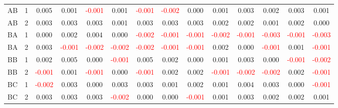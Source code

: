 \begin{table}[H]
{\begin{tabular}{llcccccccccccc}
AB & 1 & 0.005 & 0.001 & \textcolor{red}{-0.001} & 0.001 & \textcolor{red}{-0.001} & \textcolor{red}{-0.002} & 0.000 & 0.001 & 0.003 & 0.002 & 0.003 & 0.001\\
AB & 2 & 0.003 & 0.003 & 0.003 & 0.001 & 0.003 & 0.003 & 0.003 & 0.002 & 0.002 & 0.001 & 0.002 & 0.000\\
BA & 1 & 0.000 & 0.002 & 0.004 & 0.000 & \textcolor{red}{-0.002} & \textcolor{red}{-0.001} & \textcolor{red}{-0.001} & \textcolor{red}{-0.002} & \textcolor{red}{-0.001} & \textcolor{red}{-0.003} & \textcolor{red}{-0.001} & \textcolor{red}{-0.003}\\
BA & 2 & 0.003 & \textcolor{red}{-0.001} & \textcolor{red}{-0.002} & \textcolor{red}{-0.002} & \textcolor{red}{-0.002} & \textcolor{red}{-0.001} & \textcolor{red}{-0.001} & 0.002 & 0.000 & \textcolor{red}{-0.001} & 0.001 & \textcolor{red}{-0.001}\\
BB & 1 & 0.002 & 0.005 & 0.000 & \textcolor{red}{-0.001} & 0.005 & 0.002 & 0.000 & 0.001 & 0.003 & 0.000 & \textcolor{red}{-0.001} & \textcolor{red}{-0.002}\\
BB & 2 & \textcolor{red}{-0.001} & 0.001 & \textcolor{red}{-0.001} & 0.000 & \textcolor{red}{-0.001} & 0.002 & 0.002 & \textcolor{red}{-0.001} & \textcolor{red}{-0.002} & \textcolor{red}{-0.002} & 0.002 & \textcolor{red}{-0.001}\\
BC & 1 & \textcolor{red}{-0.002} & 0.003 & 0.000 & 0.003 & 0.003 & 0.001 & 0.002 & 0.001 & 0.004 & 0.003 & 0.000 & \textcolor{red}{-0.001}\\
BC & 2 & 0.003 & 0.003 & 0.003 & \textcolor{red}{-0.002} & 0.000 & 0.000 & \textcolor{red}{-0.001} & 0.001 & 0.003 & 0.002 & 0.002 & 0.001\\
\hline
    \end{tabular}%
    }
    \label{tab:cen6_uni}
\end{table}

